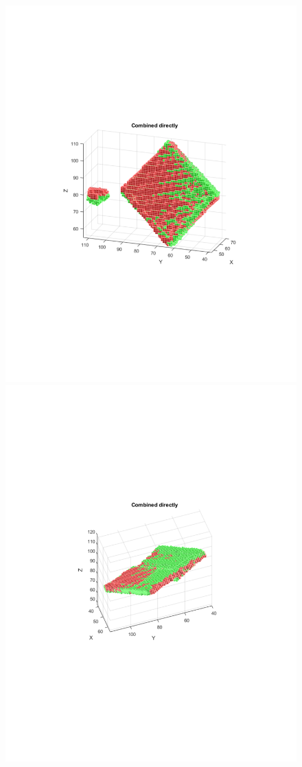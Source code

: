 \documentclass{UCF_ETD}
\begin{document}
\begin{figure}[H]
\begin{center}
\includegraphics[scale=0.35]{RobustRegistration/NoiselessAnomaliesResult4}
\includegraphics[scale=0.35]{RobustRegistration/NoiselessAnomaliesResult5}

\end{center}
\end{figure}
\end{document}
